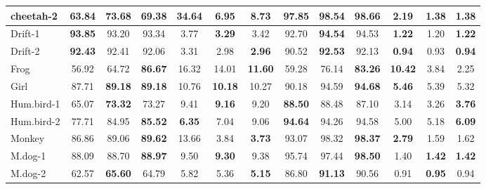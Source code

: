 \documentclass[runningheads]{llncs}
\begin{document}
\begin{table}
\begin{center}
\begin{adjustbox}{max width=\textwidth}
\begin{tabular}{|l|c|c|c||c|c|c||c|c|c||c|c|c|}
cheetah-2          & 63.84          & \textbf{73.68} & 69.38          & 34.64          & \textbf{6.95}  & 8.73           & 97.85          & 98.54          & \textbf{98.66} & \textbf{2.19}  & 1.38          & 1.38          \\ \hline
Drift-1            & \textbf{93.85} & 93.20          & 93.34          & 3.77           & \textbf{3.29}  & 3.42           & 92.70          & \textbf{94.54} & 94.53          & \textbf{1.22}  & 1.20          & \textbf{1.22} \\ \hline
Drift-2             & \textbf{92.43} & 92.41          & 92.06          & 3.31           & 2.98           & \textbf{2.96}  & 90.52          & \textbf{92.53} & 92.13          & \textbf{0.94}  & 0.93          & \textbf{0.94} \\ \hline
Frog               & 56.92          & 64.72          & \textbf{86.67} & 16.32          & 14.01          & \textbf{11.60} & 59.28          & 76.14          & \textbf{83.26} & \textbf{10.42} & 3.84          & 2.25          \\ \hline
Girl               & 87.71          & \textbf{89.18} & \textbf{89.18} & 10.76          & \textbf{10.18} & 10.27          & 90.18          & 94.59          & \textbf{94.68} & \textbf{5.46}  & 5.39          & 5.32          \\ \hline
Hum.bird-1      & 65.07          & \textbf{73.32} & 73.27          & 9.41           & \textbf{9.16}  & 9.20           & \textbf{88.50} & 88.48          &87.10 & 3.14           & 3.26          & \textbf{3.76} \\ \hline
Hum.bird-2      & 77.71          & 84.95          & \textbf{85.52} & \textbf{6.35}  & 7.04           & 9.06           & \textbf{94.64} & 94.26          & 94.58          & 5.00           & 5.18          & \textbf{6.09} \\ \hline
Monkey             & 86.86          & 89.06          & \textbf{89.62} & 13.66          & 3.84           & \textbf{3.73}  & 93.07          & 98.32          & \textbf{98.37} & \textbf{2.79}  & 1.59          & 1.62          \\ \hline
M.dog-1        & 88.09          & 88.70          & \textbf{88.97} & 9.50           & \textbf{9.30}  & 9.38           & 95.74          & 97.44          & \textbf{98.50} & 1.40           & \textbf{1.42} & \textbf{1.42} \\ \hline
M.dog-2        & 62.57          & \textbf{65.60} & 64.79          & 5.82           & 5.36           & \textbf{5.15}  & 86.80          & \textbf{91.13} & 90.56          & 0.91           & \textbf{0.95} & 0.94          \\ \hline

\end{tabular}
\end{adjustbox}
\end{center}
\end{table}
\end{document}
